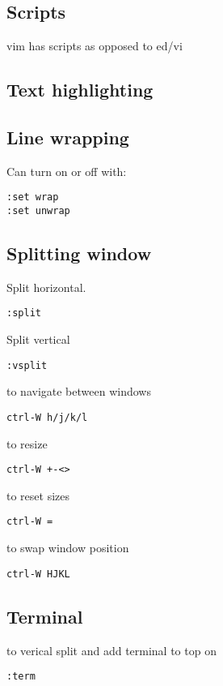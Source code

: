 
\subsection{Scripts}

vim has scripts as opposed to ed/vi

\subsection{Text highlighting}

\subsection{Line wrapping}

Can turn on or off with:

\begin{verbatim}
:set wrap
:set unwrap
\end{verbatim}


\subsection{Splitting window}

Split horizontal.
\begin{verbatim}
:split
\end{verbatim}

Split vertical
\begin{verbatim}
:vsplit
\end{verbatim}


to navigate between windows
\begin{verbatim}
ctrl-W h/j/k/l
\end{verbatim}

to resize
\begin{verbatim}
ctrl-W +-<>
\end{verbatim}

to reset sizes
\begin{verbatim}
ctrl-W =
\end{verbatim}

to swap window position
\begin{verbatim}
ctrl-W HJKL
\end{verbatim}


\subsection{Terminal}

to verical split and add terminal to top on
\begin{verbatim}
:term
\end{verbatim}


